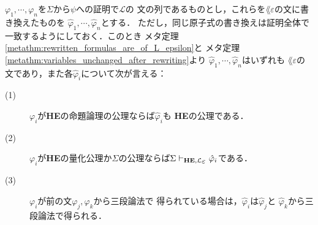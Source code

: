 	\begin{metaprf}
		$\varphi_{1},\cdots,\varphi_{n}$を$\Sigma$から$\psi$への証明で$\mathcal{L}$の
		文の列であるものとし，これらを$\lang{\varepsilon}$の文に書き換えたものを
		$\hat{\varphi}_{1},\cdots,\hat{\varphi}_{n}$とする．
		ただし，同じ原子式の書き換えは証明全体で一致するようにしておく．このとき
		メタ定理\ref{metathm:rewritten_formulas_are_of_L_epsilon}と
		メタ定理\ref{metathm:variables_unchanged_after_rewriting}より
		$\hat{\varphi}_{1},\cdots,\hat{\varphi}_{n}$はいずれも
		$\lang{\varepsilon}$の文であり，また各$\hat{\varphi}_{i}$について次が言える：
		\begin{description}
			\item[(1)] $\varphi_{i}$が{\bf HE}の命題論理の公理ならば$\hat{\varphi}_{i}$も
				{\bf HE}の公理である．
				
			\item[(2)] $\varphi_{i}$が{\bf HE}の量化公理か$\Sigma$の公理ならば$\Sigma 
				\provable{\mbox{{\bf HE}},\lang{\varepsilon}} \hat{\varphi}_{i}$である．
				
			\item[(3)] $\varphi_{i}$が前の文$\varphi_{j},\varphi_{k}$から三段論法で
				得られている場合は，$\hat{\varphi}_{i}$は$\hat{\varphi}_{j}$と
				$\hat{\varphi}_{k}$から三段論法で得られる．
		\end{description}
		

\end{metaprf}
